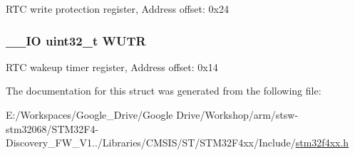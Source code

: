 R\-T\-C write protection register, Address offset\-: 0x24 \hypertarget{struct_r_t_c___type_def_ac5b3c8be61045a304d3076d4714d29f2}{
\subsubsection[{W\-U\-T\-R}]{\setlength{\rightskip}{0pt plus 5cm}\-\_\-\-\_\-\-I\-O uint32\-\_\-t W\-U\-T\-R}}\label{struct_r_t_c___type_def_ac5b3c8be61045a304d3076d4714d29f2}
R\-T\-C wakeup timer register, Address offset\-: 0x14 

The documentation for this struct was generated from the following file\-:\begin{DoxyCompactItemize}
\item 
E\-:/\-Workspaces/\-Google\-\_\-\-Drive/\-Google Drive/\-Workshop/arm/stsw-\/stm32068/\-S\-T\-M32\-F4-\/\-Discovery\-\_\-\-F\-W\-\_\-\-V1../\-Libraries/\-C\-M\-S\-I\-S/\-S\-T/\-S\-T\-M32\-F4xx/\-Include/\hyperlink{stm32f4xx_8h}{stm32f4xx.\-h}\end{DoxyCompactItemize}
